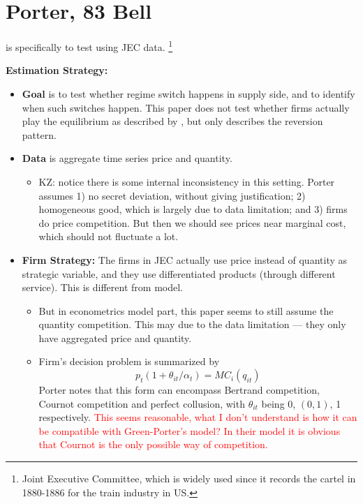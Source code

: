 \documentclass{book}
\theoremstyle{plain}
\theoremstyle{definition}
\begin{document}
\section{Porter, 83 Bell} %
\label{sec:porter_83_bell}

\textbf{}

\cite{Porter:83bell} is specifically to test \cite{Green_Porter:1984EMCA} using JEC data.
\footnote{Joint Executive Committee, which is widely used since it records the cartel in 1880-1886 for the train industry in US.}

\vspace{2mm}
\noindent
\textbf{Estimation Strategy:}
\vspace{-0.5em}
\begin{itemize}
	\item \textbf{Goal} is to test whether regime switch happens in supply side, and to identify when such switches happen.
	This paper does not test whether firms actually play the equilibrium as described by \cite{Green_Porter:1984EMCA}, but only describes the reversion pattern.
	\item \textbf{Data} is aggregate time series price and quantity.
	\begin{itemize}
		\item KZ: notice there is some internal inconsistency in this setting. Porter assumes 1) no secret deviation, without giving justification; 2) homogeneous good, which is largely due to data limitation; and 3) firms do price competition. But then we should see prices near marginal cost, which should not fluctuate a lot.
	\end{itemize}

	\item \textbf{Firm Strategy:} The firms in JEC actually use price instead of quantity as strategic variable, and they use differentiated products (through different service). This is different from \cite{Green_Porter:1984EMCA} model.
	\begin{itemize}
		\item But in econometrics model part, this paper seems to still assume the quantity competition. This may due to the data limitation --- they only have aggregated price and quantity.
		\item Firm's decision problem is summarized by 
		\[p_t(1+\theta_{it}/\alpha_t)=MC_i(q_{it})\]
		Porter notes that this form can encompass Bertrand competition, Cournot competition and perfect collusion, with $\theta_{it}$ being 0, $(0,1)$, 1 respectively.
		\textcolor{red}{This seems reasonable, what I don't understand is how it can be compatible with Green-Porter's model? In their model it is obvious that Cournot is the only possible way of competition.}


\end{itemize}
\end{itemize}
\end{document}
